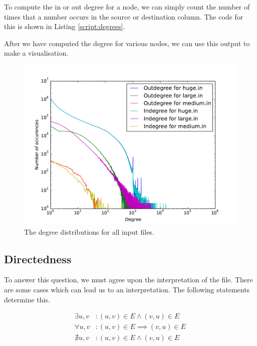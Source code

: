 \documentclass[12pt,a4paper,hidelinks]{article}
\begin{document}
To compute the in or out degree for a node, we can simply count the number of times that a number occurs in the source or destination column. The code for this is shown in Listing \ref{script:degrees}.



After we have computed the degree for various nodes, we can use this output to make a visualisation.



\begin{figure}
	\centering
	\includegraphics[scale=0.83]{degree-distributions}
	\caption{The degree distributions for all input files.}
	\label{fig:degrees}
\end{figure}

\subsection{Directedness}

To answer this question, we must agree upon the interpretation of the file. There are some cases which can lead us to an interpretation. The following statements determine this.

\begin{align}
\label{eq:somereflex} \exists u, v &: (u, v) \in E \land (v, u) \in E \\
\label{eq:allreflex} \forall u, v &: (u, v) \in E \implies (v, u) \in E \\
\label{eq:noreflex}\nexists u, v &: (u, v) \in E \land (v, u) \in E
\end{align}
\end{document}
